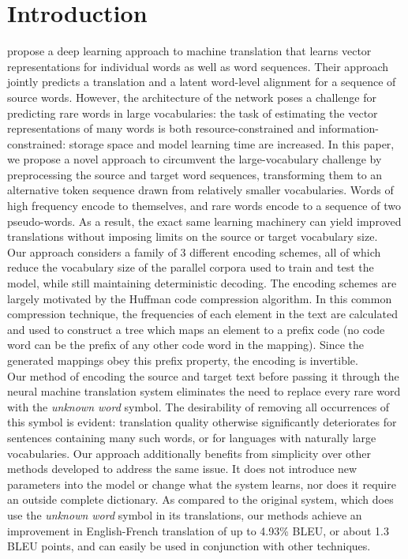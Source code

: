 \section{Introduction}
\label{sec:intro}

 propose a deep learning approach to
machine translation that learns vector representations for individual words as
well as word sequences. Their approach jointly predicts a translation and a
latent word-level alignment for a sequence of source words. However, the architecture of
the network poses a challenge for predicting rare words in large
vocabularies: the task of estimating the vector representations of many words
is both resource-constrained and information-constrained: storage space and model learning time
are increased. In this paper, we
propose a novel approach to circumvent the large-vocabulary challenge by preprocessing the source
and target word sequences, transforming them to an alternative token sequence drawn from
relatively smaller vocabularies. Words of high frequency encode to themselves, and rare
words encode to a sequence of two pseudo-words. As a result, the exact same learning machinery
can yield improved translations without imposing limits on the source or target
vocabulary size.\\

Our approach considers a family of 3 different encoding schemes, all of which
reduce the vocabulary size of the parallel corpora used to train and test the model,
while still maintaining deterministic decoding. The encoding schemes are largely
motivated by the Huffman code compression algorithm. In this common compression technique,
the frequencies of each element in the text are calculated and used to construct a tree
which maps an element to a prefix code (no code word can be the prefix of any other code
word in the mapping). Since the generated mappings obey this prefix property, the
encoding is invertible.\\

Our method of encoding the source and target text before passing it through the
neural machine translation system eliminates the need to replace every rare word with the
\emph{unknown word} symbol. The desirability of removing all occurrences of this symbol is evident: translation
quality otherwise significantly deteriorates for sentences containing many such words, or for
languages with naturally large vocabularies. Our approach additionally benefits from simplicity over
other methods developed to address the same issue. It does not introduce
new parameters into the model or change what the system learns, nor does it require an outside complete dictionary.
 As compared to the original system, which does use the \emph{unknown word} symbol in
its translations, our methods achieve an improvement in English-French translation of up to 4.93\% BLEU, or about 1.3 BLEU points,
and can easily be used in conjunction with other techniques.\\